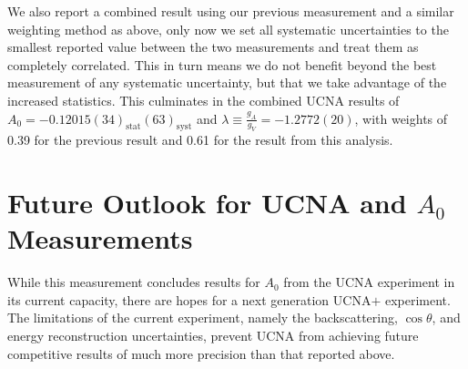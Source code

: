 We also report a combined result using our previous measurement \cite{mendenhall2013} and a
similar weighting method as above, only now we set all systematic uncertainties
to the smallest reported value between the two measurements and treat them as completely correlated.
This in turn means we do not benefit beyond the best measurement of any systematic uncertainty, but
that we take advantage of the increased statistics. This culminates in the combined UCNA results of
$A_0=-0.12015(34)_{\mathrm{stat}}(63)_{\mathrm{syst}}$ 
and $\lambda\equiv \frac{g_{A}}{g_{V}}=-1.2772(20)$, with weights of 0.39 for the previous
result \cite{mendenhall2013} and 0.61 for the result from this analysis.


\section{Future Outlook for UCNA and $A_0$ Measurements}

While this measurement concludes results for $A_0$ from the UCNA experiment in its current
capacity, there are hopes for a next generation UCNA$+$ experiment. The limitations of
the current experiment, namely the backscattering, $\cos\theta$, and energy reconstruction
uncertainties, prevent UCNA from achieving future competitive results of much more precision
than that reported above.

